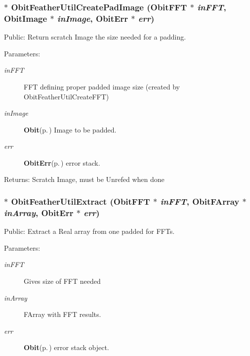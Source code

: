 \subsubsection{$\ast$ Obit\-Feather\-Util\-Create\-Pad\-Image ({\bf Obit\-FFT} $\ast$ {\em in\-FFT}, {\bf Obit\-Image} $\ast$ {\em in\-Image}, {\bf Obit\-Err} $\ast$ {\em err})}\label{ObitFeatherUtil_8c_a2}


Public: Return scratch Image the size needed for a padding. 

\begin{Desc}
\item[Parameters:]
\begin{description}
\item[{\em in\-FFT}]FFT defining proper padded image size (created by Obit\-Feather\-Util\-Create\-FFT) \item[{\em in\-Image}]{\bf Obit}{\rm (p.\,\pageref{structObit})} Image to be padded. \item[{\em err}]{\bf Obit\-Err}{\rm (p.\,\pageref{structObitErr})} error stack. \end{description}
\end{Desc}
\begin{Desc}
\item[Returns:]Scratch Image, must be Unrefed when done \end{Desc}
\subsubsection{$\ast$ Obit\-Feather\-Util\-Extract ({\bf Obit\-FFT} $\ast$ {\em in\-FFT}, {\bf Obit\-FArray} $\ast$ {\em in\-Array}, {\bf Obit\-Err} $\ast$ {\em err})}\label{ObitFeatherUtil_8c_a6}


Public: Extract a Real array from one padded for FFTs. 

\begin{Desc}
\item[Parameters:]
\begin{description}
\item[{\em in\-FFT}]Gives size of FFT needed \item[{\em in\-Array}]FArray with FFT results. \item[{\em err}]{\bf Obit}{\rm (p.\,\pageref{structObit})} error stack object. \end{description}
\end{Desc}
